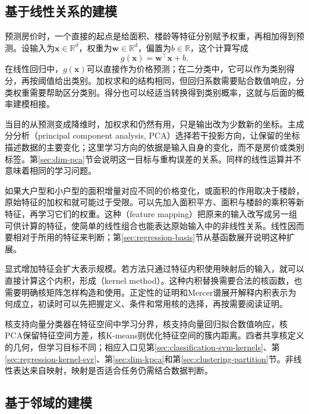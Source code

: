 \subsection{基于线性关系的建模}
\label{sec:classic-overview-linear}

预测房价时，一个直接的起点是给面积、楼龄等特征分别赋予权重，再相加得到预测。设输入为$\bm{x}\in\mathbb{R}^{d}$，权重为$\bm{w}\in\mathbb{R}^{d}$，偏置为$b\in\mathbb{R}$，这个计算写成
\begin{equation}
  g(\bm{x})=\bm{w}^{\top}\bm{x}+b.
  \label{eq:classic-overview-linear-score}
\end{equation}
在线性回归中，$g(\bm{x})$可以直接作为价格预测；在二分类中，它可以作为类别得分，再按阈值给出类别。加权求和的结构相同，但回归系数需要贴合数值响应，分类权重需要帮助区分类别。得分也可以经适当转换得到类别概率，这就与后面的概率建模相接。

当目的从预测变成降维时，加权求和仍然有用，只是输出改为少数新的坐标。主成分分析（principal component analysis, PCA）选择若干投影方向，让保留的坐标描述数据的主要变化；这里学习方向的依据是输入自身的变化，而不是房价或类别标签。第\ref{sec:dim-pca}节会说明这一目标与重构误差的关系。同样的线性运算并不意味着相同的学习问题。

如果大户型和小户型的面积增量对应不同的价格变化，或面积的作用取决于楼龄，原始特征的加权和就可能过于受限。可以先加入面积平方、面积与楼龄的乘积等新特征，再学习它们的权重。这种（feature mapping）把原来的输入改写成另一组可供计算的特征，使简单的线性组合也能表达原始输入中的非线性关系。线性因而要相对于所用的特征来判断；第\ref{sec:regression-basis}节从基函数展开说明这种扩展。

显式增加特征会扩大表示规模。若方法只通过特征内积使用映射后的输入，就可以直接计算这个内积，形成（kernel method）。这种内积替换需要合法的核函数，也需要明确核矩阵怎样构造和使用。正定性的证明和Mercer谱展开解释内积表示为何成立，初读时可以先把握定义、条件和常用核的选择，再按需要阅读证明。



核支持向量分类器在特征空间中学习分界，核支持向量回归拟合数值响应，核PCA保留特征空间方差，核K-means则优化特征空间的簇内距离。四者共享核定义的几何，但学习目标不同；相应入口见第\ref{sec:classification-svm-kernels}、第\ref{sec:regression-kernel-svr}、第\ref{sec:dim-kpca}和第\ref{sec:clustering-partition}节。非线性表达来自映射，映射是否适合任务仍需结合数据判断。

\subsection{基于邻域的建模}
\label{sec:classic-overview-neighborhood}

